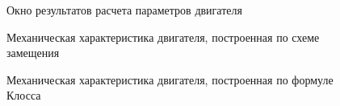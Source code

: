         \begin{figure}[h!]
            \caption{Окно результатов расчета параметров двигателя}
            \label{fig:static-scr1}
        \end{figure}

        \begin{figure}[h!]
            \caption{Механическая характеристика двигателя, построенная по схеме замещения}
            \label{fig:motor-mh1}
        \end{figure}

        \begin{figure}[h!]
            \caption{Механическая характеристика двигателя, построенная по формуле Клосса}
            \label{fig:motor-mh2}
        \end{figure}

